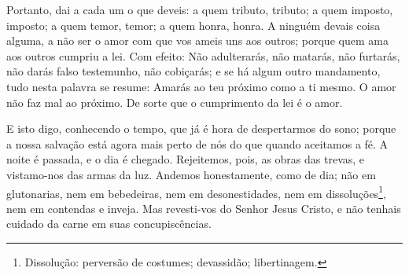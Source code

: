 Portanto, dai a cada um o que deveis: a quem tributo, tributo; a
quem imposto, imposto; a quem temor, temor; a quem honra, honra.
A ninguém devais coisa alguma, a não ser o amor com que vos
ameis uns aos outros; porque quem ama aos outros cumpriu a lei.
Com efeito: Não adulterarás, não matarás, não furtarás, não
darás falso testemunho, não cobiçarás; e se há algum outro
mandamento, tudo nesta palavra se resume: Amarás ao teu próximo como
a ti mesmo. O amor não faz mal ao próximo. De sorte que o
cumprimento da lei é o amor.

E isto digo, conhecendo o tempo, que já é hora de despertarmos do
sono; porque a nossa salvação está agora mais perto de nós do que
quando aceitamos a fé. A noite é passada, e o dia é chegado.
Rejeitemos, pois, as obras das trevas, e vistamo-nos das armas da
luz. Andemos honestamente, como de dia; não em glutonarias,
nem em bebedeiras, nem em desonestidades, nem em
dissoluções\footnote{Dissolução: perversão de costumes; devassidão;
libertinagem.}, nem em contendas e inveja. Mas revesti-vos do
Senhor Jesus Cristo, e não tenhais cuidado da carne em suas
concupiscências.

\medskip

